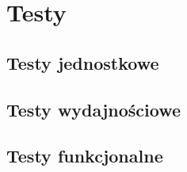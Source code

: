 
\chapter{Testy}
\label{ch:testy}

\section{Testy jednostkowe}
\label{sec:testy-jednostkowe}

\section{Testy wydajnościowe}
\label{sec:testy-wydajnosciowe}

\section{Testy funkcjonalne}
\label{sec:testy-funkcjonalne}
